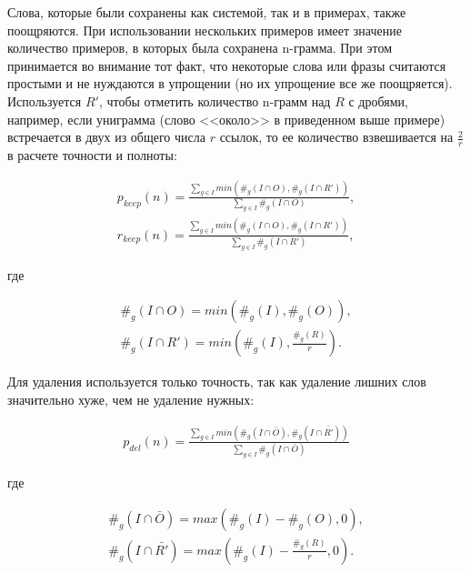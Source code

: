 Слова, которые были сохранены как системой, так и в примерах, также поощряются. При использовании нескольких примеров имеет значение количество примеров, в которых была сохранена n-грамма. При этом принимается во внимание тот факт, что некоторые слова или фразы считаются простыми и не нуждаются в упрощении (но их упрощение все же поощряется). Используется $R'$, чтобы отметить количество n-грамм над $R$ с дробями, например, если униграмма (слово <<около>> в приведенном выше примере) встречается в двух из общего числа $r$ ссылок, то ее количество взвешивается на $\frac{2}{r}$ в расчете точности и полноты:

\begin{eqnarray} 
	\label{eq:6}
	p_{keep}(n) = \frac{\sum\limits_{g\in{I}}^{} min\left( \#_{g}\left(I\cap{O}\right), \#_{g}\left(I\cap{R'}\right)\right)}{\sum\limits_{g\in{I}}^{} \#_{g}\left(I\cap{O}\right)} ,\\
	r_{keep}(n) = \frac{\sum\limits_{g\in{I}}^{} min\left( \#_{g}\left(I\cap{O}\right), \#_{g}\left(I\cap{R'}\right)\right)}{\sum\limits_{g\in{I}}^{} \#_{g}\left(I\cap{R'}\right)} ,
\end{eqnarray}

где 

\begin{eqnarray} 
	\label{eq:8}
	\#_{g}\left(I\cap{O}\right) = min\left(\#_{g}\left(I\right), \#_{g}\left(O\right)\right) ,\\
	\#_{g}\left(I\cap{R'}\right) = min\left(\#_{g}\left(I\right), \frac{\#_{g}\left(R\right)}{r}\right) .
\end{eqnarray}

Для удаления используется только точность, так как удаление лишних слов значительно хуже, чем не удаление нужных:

\begin{eqnarray} 
	\label{eq:10}
	p_{del}(n) = \frac{\sum\limits_{g\in{I}}^{} min\left( \#_{g}\left(I\cap{\bar{O}}\right), \#_{g}\left(I\cap{\bar{R'}}\right)\right)}{\sum\limits_{g\in{I}}^{} \#_{g}\left(I\cap{\bar{O}}\right)}
\end{eqnarray}

где 

\begin{eqnarray} 
	\label{eq:11}
	\#_{g}\left(I\cap{\bar{O}}\right) = max\left(\#_{g}\left(I\right) - \#_{g}\left(O\right), 0\right) ,\\
	\#_{g}\left(I\cap{\bar{R'}}\right) = max\left(\#_{g}\left(I\right) - \frac{\#_{g}\left(R\right)}{r}, 0\right) .
\end{eqnarray}

